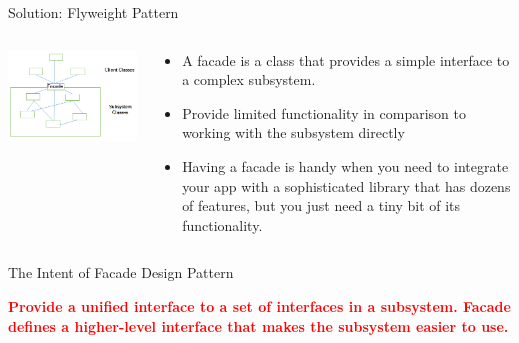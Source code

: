 \documentclass[13pt]{beamer}
\begin{document}
\begin{frame}{Solution: Flyweight Pattern}
	\begin{columns}[T]
		\begin{column}{.5\textwidth}
			\includegraphics[scale=0.6]{./images/solution.jpg}
		\end{column}
	
		\begin{column}{.5\textwidth}
			\begin{itemize}
				\item A facade is a class that provides a simple interface to a complex subsystem.
				\item Provide limited functionality in comparison to working with the subsystem directly
				\item Having a facade is handy when you need to integrate your app with a sophisticated library that has dozens of features, but you just need a tiny bit of its functionality.
			\end{itemize}
		\end{column}
	\end{columns}
\end{frame}

\begin{frame}{The Intent of Facade Design Pattern}
	\begin{center}
	\textcolor{red}{\textbf{Provide a unified interface to a set of interfaces in a subsystem. Facade defines a higher-level interface that makes the subsystem easier to use.}}\\
	\end{center}
\end{frame}
\end{document}
